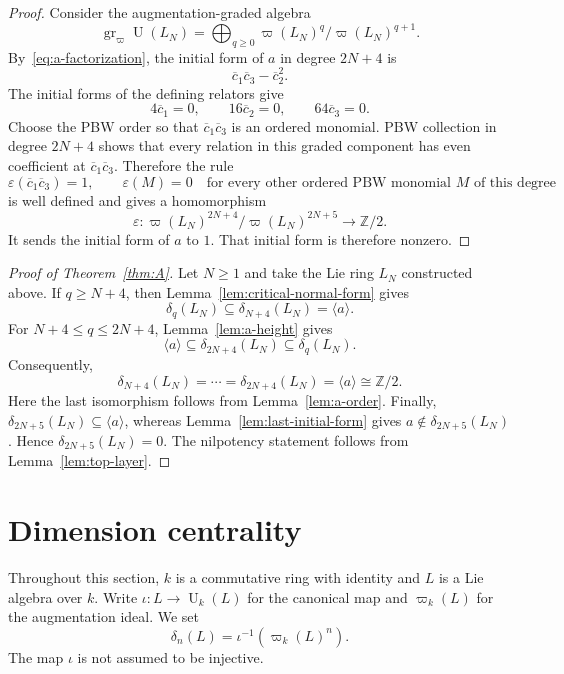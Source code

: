 \documentclass[a4paper,11pt,reqno]{amsart}
\theoremstyle{definition}
\newcommand{\Z}{\mathbb Z}
\newcommand{\U}{\operatorname U}
\newcommand{\gr}{\operatorname{gr}}
\begin{document}
\begin{proof}
Consider the augmentation-graded algebra
\[
 \gr_{\varpi}\U(L_N)
   =\bigoplus_{q\geq0}\varpi(L_N)^q/\varpi(L_N)^{q+1}.
\]
By~\eqref{eq:a-factorization}, the initial form of $a$ in degree $2N+4$
is
\[
                         \overline c_1\overline c_3-\overline c_2^2.
\]
The initial forms of the defining relators give
\[
                    4\overline c_1=0,
                    \qquad16\overline c_2=0,
                    \qquad64\overline c_3=0.
\]
Choose the PBW order so that
$\overline c_1\overline c_3$ is an ordered monomial.  PBW collection in
degree $2N+4$ shows that every relation in this graded component has even
coefficient at $\overline c_1\overline c_3$.
Therefore the rule
\[
 \varepsilon(\overline c_1\overline c_3)=1,
 \qquad
 \varepsilon(M)=0
 \quad\text{for every other ordered PBW monomial $M$ of this degree}
\]
is well defined and gives a homomorphism
\[
 \varepsilon:\varpi(L_N)^{2N+4}/\varpi(L_N)^{2N+5}
              \longrightarrow\Z/2.
\]
It sends the initial form of $a$ to $1$.  That initial form is therefore
nonzero.
\end{proof}

\begin{proof}[Proof of Theorem~\ref{thm:A}]
Let $N\geq1$ and take the Lie ring $L_N$ constructed above.  If $q\geq N+4$,
then Lemma~\ref{lem:critical-normal-form} gives
\[
                 \delta_q(L_N)\subseteq\delta_{N+4}(L_N)=\langle a\rangle.
\]
For $N+4\leq q\leq2N+4$, Lemma~\ref{lem:a-height} gives
\[
              \langle a\rangle\subseteq\delta_{2N+4}(L_N)
              \subseteq\delta_q(L_N).
\]
Consequently,
\[
 \delta_{N+4}(L_N)=\cdots=\delta_{2N+4}(L_N)=\langle a\rangle
 \cong\Z/2.
\]
Here the last isomorphism follows from Lemma~\ref{lem:a-order}.  Finally,
$\delta_{2N+5}(L_N)\subseteq\langle a\rangle$, whereas
Lemma~\ref{lem:last-initial-form} gives
$a\notin\delta_{2N+5}(L_N)$.  Hence $\delta_{2N+5}(L_N)=0$.
The nilpotency statement follows from Lemma~\ref{lem:top-layer}.
\end{proof}

\section{Dimension centrality}\label{sec:centrality}

Throughout this section, $k$ is a commutative ring with identity and $L$
is a Lie algebra over $k$.  Write $\iota:L\to\U_k(L)$ for the canonical
map and $\varpi_k(L)$ for the augmentation ideal.  We set
\[
                  \delta_n(L)=\iota^{-1}(\varpi_k(L)^n).
\]
The map $\iota$ is not assumed to be injective.
\end{document}
